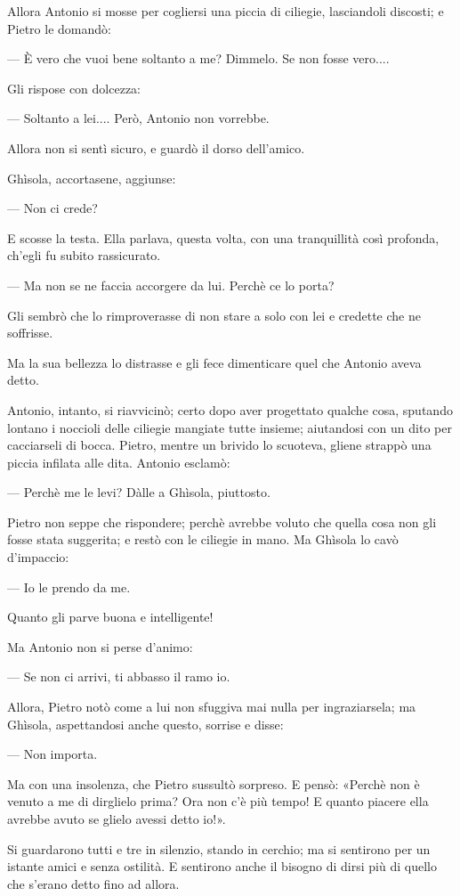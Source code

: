 Allora Antonio si mosse per cogliersi una piccia di ciliegie, lasciandoli discosti; e Pietro le domandò:

— È vero che vuoi bene soltanto a me? Dimmelo. Se non fosse vero....

Gli rispose con dolcezza:

— Soltanto a lei.... Però, Antonio non vorrebbe.

Allora non si sentì sicuro, e guardò il dorso dell'amico.

Ghìsola, accortasene, aggiunse:

— Non ci crede?

E scosse la testa. Ella parlava, questa volta, con una tranquillità così profonda, ch'egli fu subito rassicurato.

— Ma non se ne faccia accorgere da lui. Perchè ce lo porta?

Gli sembrò che lo rimproverasse di non stare a solo con lei e credette che ne soffrisse.

Ma la sua bellezza lo distrasse e gli fece dimenticare quel che Antonio aveva detto.

Antonio, intanto, si riavvicinò; certo dopo aver progettato qualche cosa, sputando lontano i noccioli delle ciliegie mangiate tutte insieme; aiutandosi con un dito per cacciarseli di bocca. Pietro, mentre un brivido lo scuoteva, gliene strappò una piccia infilata alle dita. Antonio esclamò:

— Perchè me le levi? Dàlle a Ghìsola, piuttosto.

Pietro non seppe che rispondere; perchè avrebbe voluto che quella cosa non gli fosse stata suggerita; e restò con le ciliegie in mano. Ma Ghìsola lo cavò d'impaccio:

— Io le prendo da me.

Quanto gli parve buona e intelligente!

Ma Antonio non si perse d'animo:

— Se non ci arrivi, ti abbasso il ramo io.

Allora, Pietro notò come a lui non sfuggiva mai nulla per ingraziarsela; ma Ghìsola, aspettandosi anche questo, sorrise e disse:

— Non importa.

Ma con una insolenza, che Pietro sussultò sorpreso. E pensò: «Perchè non è venuto a me di dirglielo prima? Ora non c'è più tempo! E quanto piacere ella avrebbe avuto se glielo avessi detto io!».

Si guardarono tutti e tre in silenzio, stando in cerchio; ma si sentirono per un istante amici e senza ostilità. E sentirono anche il bisogno di dirsi più di quello che s'erano detto fino ad allora.

